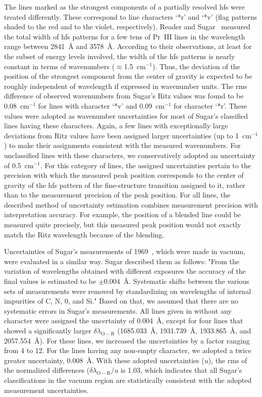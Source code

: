 \documentclass[10pt]{article}
\begin{document}
The lines marked as the strongest components of a partially resolved hfs were treated differently.
These correspond to line characters `*r' and `*v' (flag patterns shaded to the red and to the violet,
respectively). Reader and Sugar~\cite{Reader1965} measured the total width of hfs patterns for a few 
tens of Pr~III lines in the wavelength range between 2841~{\AA} and 3578~{\AA}. According to their
observations, at least for the subset of energy levels involved, the width of the hfs patterns is
nearly constant in terms of wavenumbers ($\approx$1.5~cm$^{-1}$). Thus, the deviation of the position of 
the strongest component from the center of gravity is expected to be roughly independent 
of wavelength if expressed in wavenumber units. The rms difference of observed wavenumbers from Sugar's
Ritz values was found to be 0.08~cm$^{-1}$ for lines with character `*v' and 0.09~cm$^{-1}$ for character 
`*r'. These values were adopted as wavenumber uncertainties for most of Sugar's classified lines having
these characters. Again, a few lines with exceptionally large deviations from Ritz values have been 
assigned larger uncertainties (up to 1~cm$^{-1}$) to make their assignments consistent with the 
measured wavenumbers. For unclassified lines with these characters, we conservatively adopted an 
uncertainty of 0.5~cm$^{-1}$. For this category of lines, the assigned uncertainties pertain to the
precision with which the measured peak position corresponds to the center of gravity of the
hfs pattern of the fine-structure transition assigned to it, rather than to the measurement precision
of the peak position. For all lines, the described method of uncertainty estimation combines 
measurement precision with interpretation accuracy. For example, the position of a blended line could be 
measured quite precisely, but this measured peak position would not exactly match the Ritz wavelength 
because of the blending.

Uncertainties of Sugar's measurements of 1969~\cite{Sugar1969}, which were made in vacuum, were evaluated
in a similar way. Sugar described them as follows: "From the variation of wavelengths obtained with different 
exposures the accuracy of the final values is estimated to be $\pm 0.004$~{\AA}. Systematic shifts between
the various sets of measurements were removed by standardizing on wavelengths of internal impurities of
C, N, 0, and Si." Based on that, we assumed that there are no systematic errors in Sugar's measurements. 
All lines given in \cite{Sugar1969} without any character were assigned the uncertainty of 0.004~{\AA},
except for four lines that showed a significantly larger $\delta\lambda_{\mathrm{O}-\mathrm{R}}$ (1685.033~{\AA}, 
1931.739~{\AA}, 1933.865~{\AA}, and 2057.554~{\AA}). For these lines, we increased the uncertainties by a 
factor ranging from 4 to 12. For the lines having any non-empty character, we adopted a twice greater 
uncertainty, 0.008~{\AA}. With these adopted uncertainties ($u$), the rms of the normalized differences 
($\delta\lambda_{\mathrm{O}-\mathrm{R}}/u$ is 1.03, which indicates that all Sugar's classifications in
the vacuum region are statistically consistent with the adopted measurement uncertainties.
\end{document}
